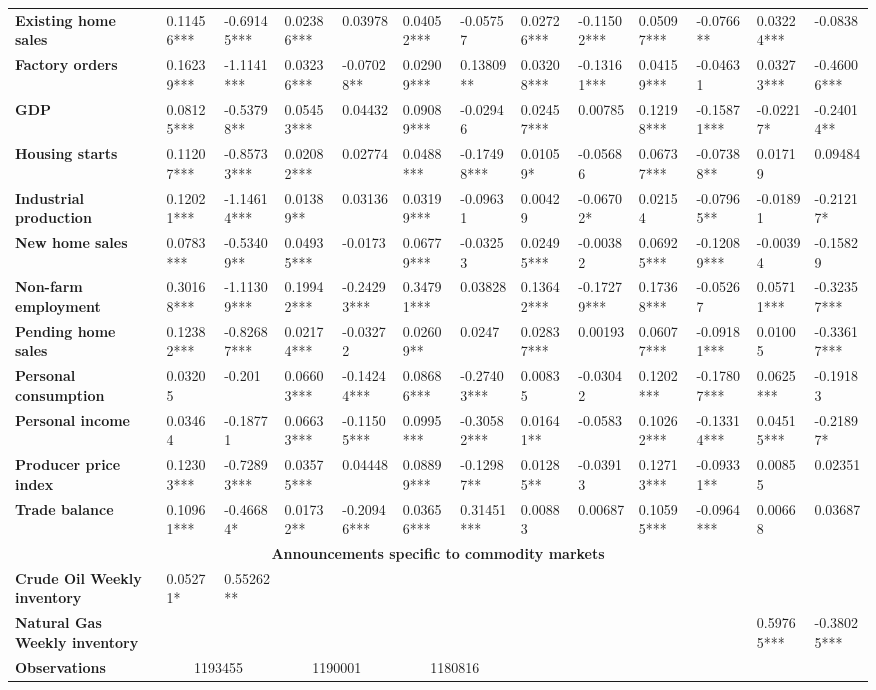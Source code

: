 \begin{sidewaystable}
{\begin{tabular}{@{}lllllllllllll@{}}
\textbf{Existing home sales}& 0.11456*** & -0.69145*** & 0.02386*** & 0.03978 & 0.04052*** & -0.05757 & 0.02726*** & -0.11502*** & 0.05097*** & -0.0766** & 0.03224*** & -0.0838 \\ \textbf{Factory orders}& 0.16239*** & -1.1141*** & 0.03236*** & -0.07028** & 0.02909*** & 0.13809** & 0.03208*** & -0.13161*** & 0.04159*** & -0.04631 & 0.03273*** & -0.46006*** \\ \textbf{GDP}& 0.08125*** & -0.53798** & 0.05453*** & 0.04432 & 0.09089*** & -0.02946 & 0.02457*** & 0.00785 & 0.12198*** & -0.15871*** & -0.02217* & -0.24014** \\ \textbf{Housing starts}& 0.11207*** & -0.85733*** & 0.02082*** & 0.02774 & 0.0488*** & -0.17498*** & 0.01059* & -0.05686 & 0.06737*** & -0.07388** & 0.01719 & 0.09484 \\ \textbf{Industrial production}& 0.12021*** & -1.14614*** & 0.01389** & 0.03136 & 0.03199*** & -0.09631 & 0.00429 & -0.06702* & 0.02154 & -0.07965** & -0.01891 & -0.21217* \\ \textbf{New home sales}& 0.0783*** & -0.53409** & 0.04935*** & -0.0173 & 0.06779*** & -0.03253 & 0.02495*** & -0.00382 & 0.06925*** & -0.12089*** & -0.00394 & -0.15829 \\ \textbf{Non-farm employment}& 0.30168*** & -1.11309*** & 0.19942*** & -0.24293*** & 0.34791*** & 0.03828 & 0.13642*** & -0.17279*** & 0.17368*** & -0.05267 & 0.05711*** & -0.32357*** \\ \textbf{Pending home sales}& 0.12382*** & -0.82687*** & 0.02174*** & -0.03272 & 0.02609** & 0.0247 & 0.02837*** & 0.00193 & 0.06077*** & -0.09181*** & 0.01005 & -0.33617*** \\ \textbf{Personal consumption}& 0.03205 & -0.201 & 0.06603*** & -0.14244*** & 0.08686*** & -0.27403*** & 0.00835 & -0.03042 & 0.1202*** & -0.17807*** & 0.0625*** & -0.19183 \\ \textbf{Personal income}& 0.03464 & -0.18771 & 0.06633*** & -0.11505*** & 0.0995*** & -0.30582*** & 0.01641** & -0.0583 & 0.10262*** & -0.13314*** & 0.04515*** & -0.21897* \\ \textbf{Producer price index}& 0.12303*** & -0.72893*** & 0.03575*** & 0.04448 & 0.08899*** & -0.12987** & 0.01285** & -0.03913 & 0.12713*** & -0.09331** & 0.00855 & 0.02351 \\ \textbf{Trade balance}& 0.10961*** & -0.46684* & 0.01732** & -0.20946*** & 0.03656*** & 0.31451*** & 0.00883 & 0.00687 & 0.10595*** & -0.0964*** & 0.00668 & 0.03687 \\  \midrule \multicolumn{13}{c}{\textbf{Announcements specific to commodity markets}} \\ \midrule \textbf{Crude Oil Weekly inventory}& 0.05271* & 0.55262** &  &  &  &  &  &  &  &  &  &  \\ \textbf{Natural Gas Weekly inventory}&  &  &  &  &  &  &  &  &  &  & 0.59765*** & -0.38025*** \\  \midrule \textbf{Observations}             &\multicolumn{2}{c}{ 1193455 }                                                 & \multicolumn{2}{c}{ 1190001 }                                                 & \multicolumn{2}{c}{ 1180816 }                                                 & 
\end{tabular}}
\end{sidewaystable}
